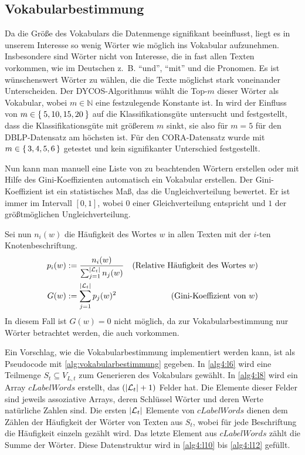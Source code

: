 \subsection{Vokabularbestimmung}\label{sec:vokabularbestimmung}
Da die Größe des Vokabulars die Datenmenge signifikant beeinflusst,
liegt es in unserem Interesse so wenig Wörter wie möglich ins
Vokabular aufzunehmen. Insbesondere sind Wörter nicht von Interesse,
die in fast allen Texten vorkommen, wie im Deutschen z.~B.
\enquote{und}, \enquote{mit} und die Pronomen. Es ist wünschenswert Wörter zu
wählen, die die Texte möglichst stark voneinander Unterscheiden. Der
DYCOS-Algorithmus wählt die Top-$m$ dieser Wörter als Vokabular, wobei
$m \in \mathbb{N}$ eine festzulegende Konstante ist. In \cite[S. 365]{aggarwal2011}
wird der Einfluss von $m \in \Set{5,10, 15,20}$ auf die Klassifikationsgüte
untersucht und festgestellt, dass die Klassifikationsgüte mit größerem $m$
sinkt, sie also für $m=5$ für den DBLP-Datensatz am höchsten ist. Für den
CORA-Datensatz wurde mit $m \in \set{3,4,5,6}$ getestet und kein signifikanter
Unterschied festgestellt.

Nun kann man manuell eine Liste von zu beachtenden Wörtern erstellen
oder mit Hilfe des Gini-Koeffizienten automatisch ein Vokabular erstellen.
Der Gini-Koeffizient ist ein statistisches Maß, das die Ungleichverteilung
bewertet. Er ist immer im Intervall $[0,1]$, wobei $0$ einer
Gleichverteilung entspricht und $1$ der größtmöglichen Ungleichverteilung.

Sei nun $n_i(w)$ die Häufigkeit des Wortes $w$ in allen Texten mit der $i$-ten
Knotenbeschriftung.
\begin{align}
    p_i(w) &:= \frac{n_i(w)}{\sum_{j=1}^{|\mathcal{L}_t|} n_j(w)} &\text{(Relative Häufigkeit des Wortes $w$)}\\
    G(w)   &:= \sum_{j=1}^{|\mathcal{L}_t|} p_j(w)^2              &\text{(Gini-Koeffizient von $w$)}
\end{align}
In diesem Fall ist $G(w)=0$ nicht möglich, da zur Vokabularbestimmung nur
Wörter betrachtet werden, die auch vorkommen.

Ein Vorschlag, wie die Vokabularbestimmung implementiert werden kann, ist als
Pseudocode mit \cref{alg:vokabularbestimmung} gegeben. In \cref{alg4:l6} wird
eine Teilmenge $S_t \subseteq V_{L,t}$ zum Generieren des Vokabulars gewählt.
In \cref{alg4:l8} wird ein Array $cLabelWords$ erstellt, das $(|\mathcal{L}_t|+1)$
Felder hat. Die Elemente dieser Felder sind jeweils assoziative Arrays, deren
Schlüssel Wörter und deren Werte natürliche Zahlen sind. Die ersten $|\mathcal{L}_t|$
Elemente von $cLabelWords$ dienen dem Zählen der Häufigkeit der Wörter von
Texten aus $S_t$, wobei für jede Beschriftung die Häufigkeit einzeln gezählt
wird. Das letzte Element aus $cLabelWords$ zählt die Summe der Wörter. Diese
Datenstruktur wird in \cref{alg4:l10} bis \ref{alg4:l12} gefüllt.

